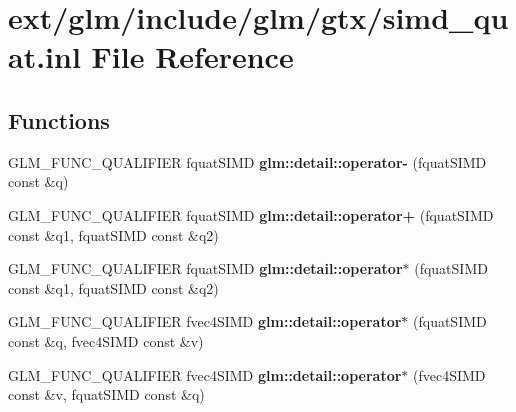 \hypertarget{simd__quat_8inl}{\section{ext/glm/include/glm/gtx/simd\-\_\-quat.inl File Reference}
\label{simd__quat_8inl}
}
\subsection*{Functions}
\begin{DoxyCompactItemize}
\item 
\hypertarget{namespaceglm_1_1detail_a07dbb5e436fcb64a3c165a15c920a484}{G\-L\-M\-\_\-\-F\-U\-N\-C\-\_\-\-Q\-U\-A\-L\-I\-F\-I\-E\-R fquat\-S\-I\-M\-D {\bfseries glm\-::detail\-::operator-\/} (fquat\-S\-I\-M\-D const \&q)}\label{namespaceglm_1_1detail_a07dbb5e436fcb64a3c165a15c920a484}

\item 
\hypertarget{namespaceglm_1_1detail_a0010f5683721f2724e0e00709fc51405}{G\-L\-M\-\_\-\-F\-U\-N\-C\-\_\-\-Q\-U\-A\-L\-I\-F\-I\-E\-R fquat\-S\-I\-M\-D {\bfseries glm\-::detail\-::operator+} (fquat\-S\-I\-M\-D const \&q1, fquat\-S\-I\-M\-D const \&q2)}\label{namespaceglm_1_1detail_a0010f5683721f2724e0e00709fc51405}

\item 
\hypertarget{namespaceglm_1_1detail_a6e7c8ca42117ec6c0c60b765f083557b}{G\-L\-M\-\_\-\-F\-U\-N\-C\-\_\-\-Q\-U\-A\-L\-I\-F\-I\-E\-R fquat\-S\-I\-M\-D {\bfseries glm\-::detail\-::operator$\ast$} (fquat\-S\-I\-M\-D const \&q1, fquat\-S\-I\-M\-D const \&q2)}\label{namespaceglm_1_1detail_a6e7c8ca42117ec6c0c60b765f083557b}

\item 
\hypertarget{namespaceglm_1_1detail_af198c6bb57f5b38b3fd5961b8d9b352e}{G\-L\-M\-\_\-\-F\-U\-N\-C\-\_\-\-Q\-U\-A\-L\-I\-F\-I\-E\-R fvec4\-S\-I\-M\-D {\bfseries glm\-::detail\-::operator$\ast$} (fquat\-S\-I\-M\-D const \&q, fvec4\-S\-I\-M\-D const \&v)}\label{namespaceglm_1_1detail_af198c6bb57f5b38b3fd5961b8d9b352e}

\item 
\hypertarget{namespaceglm_1_1detail_a8da00ab5a90294ba3a8c7ebcb20a8bed}{G\-L\-M\-\_\-\-F\-U\-N\-C\-\_\-\-Q\-U\-A\-L\-I\-F\-I\-E\-R fvec4\-S\-I\-M\-D {\bfseries glm\-::detail\-::operator$\ast$} (fvec4\-S\-I\-M\-D const \&v, fquat\-S\-I\-M\-D const \&q)}\label{namespaceglm_1_1detail_a8da00ab5a90294ba3a8c7ebcb20a8bed}


\end{DoxyCompactItemize}

